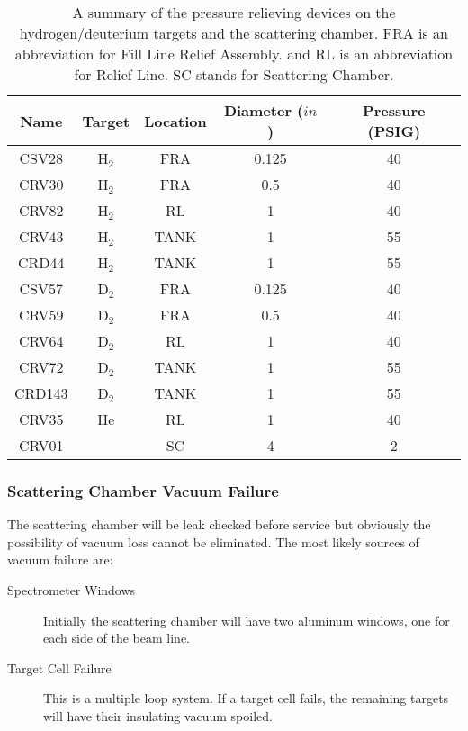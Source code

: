 \begin{safetyen}{10}{5}
\begin{table}[htb]
\begin{center}
\begin{tabular}{|c|c|c|c|c|} \hline
Name & Target & Location & Diameter ($in$) & Pressure (PSIG) \\ \hline
CSV28 & H$_2$ & FRA & 0.125 & 40 \\ \hline
CRV30 & H$_2$ & FRA & 0.5 & 40 \\ \hline
CRV82 & H$_2$ & RL &  1 & 40 \\ \hline
CRV43 & H$_2$ & TANK & 1 & 55 \\ \hline
CRD44 & H$_2$ & TANK & 1 & 55 \\ \hline
CSV57 & D$_2$ & FRA & 0.125 & 40 \\ \hline
CRV59 & D$_2$ & FRA & 0.5 & 40 \\ \hline
CRV64 & D$_2$ & RL &  1 & 40 \\ \hline
CRV72 & D$_2$ & TANK & 1 & 55 \\ \hline
CRD143 & D$_2$ & TANK & 1 & 55 \\ \hline
CRV35 & He & RL &  1 & 40 \\ \hline
CRV01 &  & SC & 4 & 2 \\ \hline
\end{tabular}
\end{center}
\caption[Cryotarget: Relief Device Summary]{ A summary of the pressure relieving devices on the
hydrogen/deuterium targets and the scattering chamber. FRA
is an abbreviation for Fill Line Relief Assembly. 
and RL is an abbreviation for
Relief Line. SC stands for Scattering Chamber.}
\label{ta:pre}
\end{table}

\subsubsection{ Scattering Chamber Vacuum Failure}

The scattering chamber will be leak checked before service but obviously
the possibility of vacuum loss cannot be eliminated. The most
likely sources of vacuum failure are:

\begin{description}
\item[Spectrometer Windows] Initially the scattering chamber will have two
 aluminum windows, one for each side of the beam line.
\item[Target Cell Failure] This is a multiple loop system. If a target
cell fails, the remaining targets will have their insulating
vacuum spoiled.
\end{description}


\end{safetyen}
